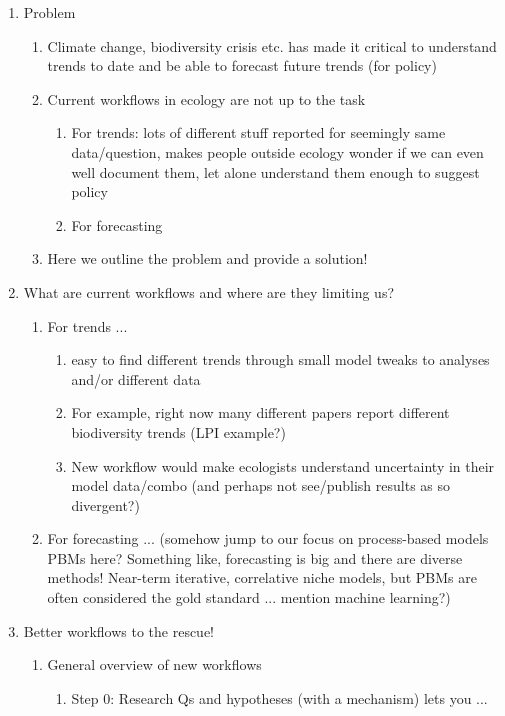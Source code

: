 \documentclass[11pt]{article}
\begin{document}
\begin{enumerate}
\item Problem
\begin{enumerate}
\item Climate change, biodiversity crisis etc. has made it critical to understand trends to date and be able to forecast future trends (for policy)
\item Current workflows in ecology are not up to the task
\begin{enumerate}
\item For trends: lots of different stuff reported for seemingly same data/question, makes people outside ecology wonder if we can even well document them, let alone understand them enough to suggest policy
\item For forecasting
\end{enumerate}
\item Here we outline the problem and provide a solution!
\end{enumerate}
\item What are current workflows and where are they limiting us?
\begin{enumerate}
\item For trends ...
\begin{enumerate}
\item easy to find different trends through small model tweaks to analyses and/or different data
\item For example, right now many different papers report different biodiversity trends (LPI example?)
\item New workflow would make ecologists understand uncertainty in their model data/combo (and perhaps not see/publish results as so divergent?)
\end{enumerate}
\item For forecasting ... (somehow jump to our focus on process-based models PBMs here? Something like, forecasting is big and there are diverse methods! Near-term iterative, correlative niche models, but PBMs are often considered the gold standard ... mention machine learning?)
\end{enumerate}
\item Better workflows to the rescue! 
\begin{enumerate}
\item General overview of new workflows
\begin{enumerate}
\item Step 0: Research Qs and hypotheses (with a mechanism) lets you ...

\end{enumerate}
\end{enumerate}
\end{enumerate}
\end{document}
